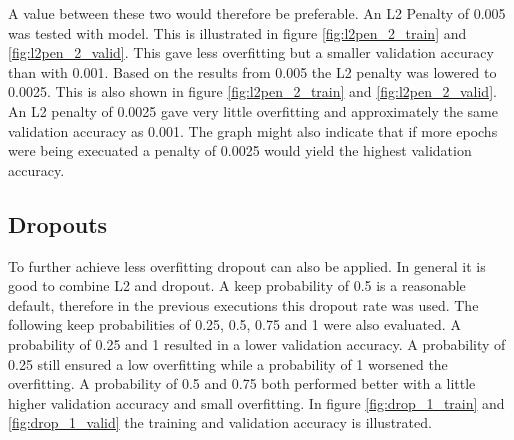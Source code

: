 

A value between these two  would therefore be preferable. An L2 Penalty of 0.005 was tested with model. This is illustrated in figure \ref{fig:l2pen_2_train} and \ref{fig:l2pen_2_valid}. This gave less overfitting but a smaller validation accuracy than with 0.001. Based on the results from 0.005 the L2 penalty was lowered to 0.0025. This is also shown in figure \ref{fig:l2pen_2_train} and \ref{fig:l2pen_2_valid}. An L2 penalty of 0.0025 gave very little overfitting and approximately the same validation accuracy as 0.001. The graph might also indicate that if more epochs were being execuated a penalty of 0.0025 would yield the highest validation accuracy.



\FloatBarrier
\subsection{Dropouts}
To further achieve less overfitting dropout can also be applied. In general it is good to combine L2 and dropout. A keep probability of 0.5 is a reasonable default, therefore in the previous executions this dropout rate was used. The following keep probabilities of 0.25, 0.5, 0.75 and 1 were also evaluated. A probability of 0.25 and 1 resulted in a lower validation accuracy. A probability of 0.25 still ensured a low overfitting while a probability of 1 worsened the overfitting. A probability of 0.5 and 0.75 both performed better with a little higher validation accuracy and small overfitting. In figure \ref{fig:drop_1_train} and \ref{fig:drop_1_valid} the training and validation accuracy is illustrated.


